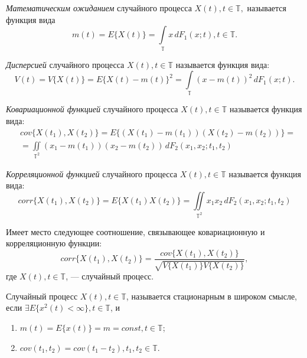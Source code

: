 \begin{Definition}
	\textit{Математическим ожиданием} случайного процесса $ X(t), t \in \mathbb{T}, $ называется функция вида
	\begin{equation*}
		m(t) = E \{ X(t) \} = \int \limits_{\mathbb{T}} x \, dF_1(x;t), t \in \mathbb{T}.
	\end{equation*}
\end{Definition}

\begin{Definition}
	\textit{Дисперсией} случайного процесса $ X(t), t \in \mathbb{T} $ называется функция вида:
	\begin{equation*}
		V(t) = V \{ X(t) \} = E \{ X(t) - m(t) \}^2 = \int \limits_{\mathbb{T}} (x - m(t))^2 \, dF_1(x; t).
	\end{equation*}
\end{Definition}

\begin{Definition}
	\textit{Ковариационной функцией} случайного процесса $ X(t), t \in \mathbb{T} $ называется функция вида:
	\begin{eqnarray*}
		& cov\{ X(t_1), X(t_2) \} = E \{ (X(t_1) - m(t_1)) (X(t_2) - m(t_2)) \} = \\
		& = \iint \limits_{\mathbb{T}^2} (x_1 - m(t_1)) (x_2 - m(t_2)) \, dF_2(x_1, x_2; t_1, t_2)
	\end{eqnarray*}
\end{Definition}

\begin{Definition}
	\textit{Корреляционной функцией} случайного процесса $ X(t), t \in \mathbb{T} $ называется функция вида:
	\begin{equation*}
		corr\{ X(t_1), X(t_2) \} = E \{ X(t_1)X(t_2) \} = \iint \limits_{\mathbb{T}^2} x_1 x_2 \, dF_2(x_1, x_2; t_1, t_2)
	\end{equation*}
\end{Definition}

\begin{Remark}
\label{rem:corr_cov}
	Имеет место следующее соотношение, связывающее ковариационную и корреляционную функции:
	\begin{equation*}
		corr\{ X(t_1), X(t_2)\} = \frac{cov\{ X(t_1), X(t_2) \}}{\sqrt{ V\{ X(t_1) \} V\{ X(t_2) \} }},
	\end{equation*}
	где $ X(t), t \in \mathbb{T} $, --- случайный процесс.
\end{Remark}

\begin{Definition}
	Случайный процесс $ X (t), t \in \mathbb{T} $, называется стационарным в широком смысле, если $ \exists E \{ x^2(t) < \infty \}, t \in \mathbb{T} $, и
	\begin{enumerate}
		\item $ m(t) = E \{ x(t) \} = m = const, t \in \mathbb{T} $;
		\item $ cov(t_1, t_2) = cov(t_1 - t_2), t_1,t_2 \in \mathbb{T} $.
	\end{enumerate}
\end{Definition}

